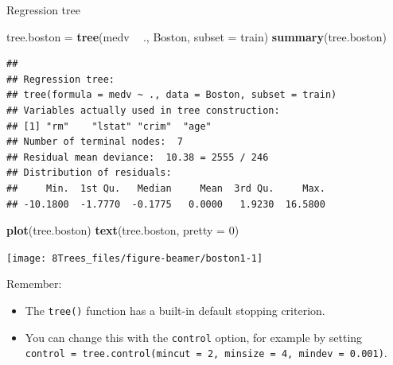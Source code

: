 \documentclass[10pt,ignorenonframetext,]{beamer}
\newenvironment{Shaded}{\begin{snugshade}}{\end{snugshade}}
\newcommand{\KeywordTok}[1]{\textcolor[rgb]{0.13,0.29,0.53}{\textbf{#1}}}
\newcommand{\DataTypeTok}[1]{\textcolor[rgb]{0.13,0.29,0.53}{#1}}
\newcommand{\DecValTok}[1]{\textcolor[rgb]{0.00,0.00,0.81}{#1}}
\newcommand{\StringTok}[1]{\textcolor[rgb]{0.31,0.60,0.02}{#1}}
\newcommand{\OperatorTok}[1]{\textcolor[rgb]{0.81,0.36,0.00}{\textbf{#1}}}
\newcommand{\NormalTok}[1]{#1}
\providecommand{\tightlist}{%
  \setlength{\itemsep}{0pt}\setlength{\parskip}{0pt}}
\begin{document}
\begin{frame}[fragile]

\begin{block}{Regression tree}

\scriptsize

\begin{Shaded}
\begin{Highlighting}[]
\NormalTok{tree.boston =}\StringTok{ }\KeywordTok{tree}\NormalTok{(medv }\OperatorTok{~}\StringTok{ }\NormalTok{., Boston, }\DataTypeTok{subset =}\NormalTok{ train)}
\KeywordTok{summary}\NormalTok{(tree.boston)}
\end{Highlighting}
\end{Shaded}

\begin{verbatim}
## 
## Regression tree:
## tree(formula = medv ~ ., data = Boston, subset = train)
## Variables actually used in tree construction:
## [1] "rm"    "lstat" "crim"  "age"  
## Number of terminal nodes:  7 
## Residual mean deviance:  10.38 = 2555 / 246 
## Distribution of residuals:
##     Min.  1st Qu.   Median     Mean  3rd Qu.     Max. 
## -10.1800  -1.7770  -0.1775   0.0000   1.9230  16.5800
\end{verbatim}

\end{block}

\end{frame}

\begin{frame}[fragile]

\scriptsize

\begin{Shaded}
\begin{Highlighting}[]
\KeywordTok{plot}\NormalTok{(tree.boston)}
\KeywordTok{text}\NormalTok{(tree.boston, }\DataTypeTok{pretty =} \DecValTok{0}\NormalTok{)}
\end{Highlighting}
\end{Shaded}

\begin{center}\texttt{[image: 8Trees\_files/figure-beamer/boston1-1]} \end{center}

\normalsize
Remember:

\begin{itemize}
\tightlist
\item
  The \texttt{tree()} function has a built-in default stopping
  criterion.
\item
  You can change this with the \texttt{control} option, for example by
  setting
  \texttt{control\ =\ tree.control(mincut\ =\ 2,\ minsize\ =\ 4,\ mindev\ =\ 0.001)}.
\end{itemize}

\end{frame}
\end{document}
